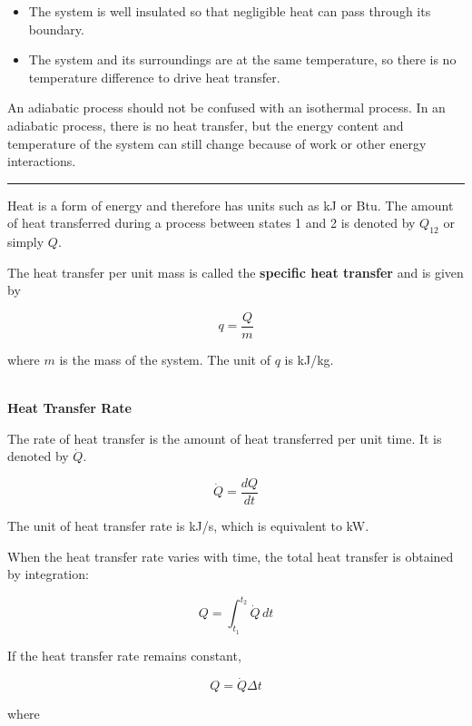 \documentclass[12pt]{article}
\newcommand{\mysubsection}[2]{%
    \vspace{5px}
    \noindent{\headingfont\large #1\space #2\par}
    \vspace{4pt}
    \hrule
    \vspace{15pt}
}
\begin{document}
\begin{itemize}
    \item The system is well insulated so that negligible heat can pass through its boundary.
    \item The system and its surroundings are at the same temperature, so there is no temperature difference to drive heat transfer.
\end{itemize}

An adiabatic process should not be confused with an isothermal process. In an adiabatic process, there is no heat transfer, but the energy content and temperature of the system can still change because of work or other energy interactions. 

\mysubsection{}{Amount of Heat Transfer}

Heat is a form of energy and therefore has units such as kJ or Btu. The amount of heat transferred during a process between states 1 and 2 is denoted by $Q_{12}$ or simply $Q$.

The heat transfer per unit mass is called the \textbf{specific heat transfer} and is given by

\begin{equation*}
q = \frac{Q}{m}
\end{equation*}

where $m$ is the mass of the system. The unit of $q$ is kJ/kg. 

\textbf{\\ Heat Transfer Rate}

The rate of heat transfer is the amount of heat transferred per unit time. It is denoted by $\dot{Q}$.

\begin{equation*}
\dot{Q} = \frac{dQ}{dt}
\end{equation*}

The unit of heat transfer rate is kJ/s, which is equivalent to kW. 

When the heat transfer rate varies with time, the total heat transfer is obtained by integration:

\begin{equation*}
Q = \int_{t_1}^{t_2} \dot{Q}\,dt
\end{equation*}

If the heat transfer rate remains constant,

\begin{equation*}
Q = \dot{Q}\Delta t
\end{equation*}

where
\end{document}
